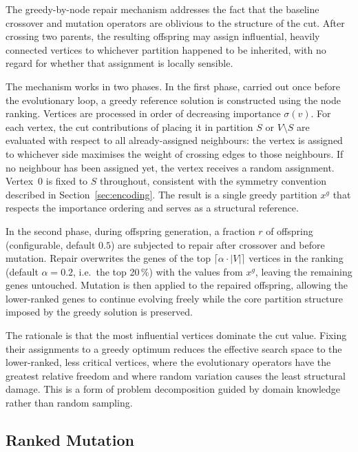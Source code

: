 \documentclass[12pt]{article}
\begin{document}
The greedy-by-node repair mechanism addresses the fact that the baseline crossover
and mutation operators are oblivious to the structure of the cut.
After crossing two parents, the resulting offspring may assign influential, heavily
connected vertices to whichever partition happened to be inherited, with no regard
for whether that assignment is locally sensible.

The mechanism works in two phases.
In the first phase, carried out once before the evolutionary loop, a greedy
reference solution is constructed using the node ranking.
Vertices are processed in order of decreasing importance $\sigma(v)$.
For each vertex, the cut contributions of placing it in partition $S$ or $V \setminus S$
are evaluated with respect to all already-assigned neighbours: the vertex is assigned
to whichever side maximises the weight of crossing edges to those neighbours.
If no neighbour has been assigned yet, the vertex receives a random assignment.
Vertex~0 is fixed to $S$ throughout, consistent with the symmetry convention
described in Section~\ref{sec:encoding}.
The result is a single greedy partition $x^{g}$ that respects the importance ordering
and serves as a structural reference.

In the second phase, during offspring generation, a fraction $r$ of offspring
(configurable, default $0.5$) are subjected to repair after crossover and before
mutation.
Repair overwrites the genes of the top $\lceil \alpha \cdot |V| \rceil$ vertices in
the ranking (default $\alpha = 0.2$, i.e.\ the top 20\,\%) with the values from
$x^{g}$, leaving the remaining genes untouched.
Mutation is then applied to the repaired offspring, allowing the lower-ranked genes
to continue evolving freely while the core partition structure imposed by the greedy
solution is preserved.

The rationale is that the most influential vertices dominate the cut value.
Fixing their assignments to a greedy optimum reduces the effective search space to
the lower-ranked, less critical vertices, where the evolutionary operators have the
greatest relative freedom and where random variation causes the least structural
damage.
This is a form of problem decomposition guided by domain knowledge rather than
random sampling.

\subsection{Ranked Mutation}
\label{sec:ranked-mutation}
\end{document}

